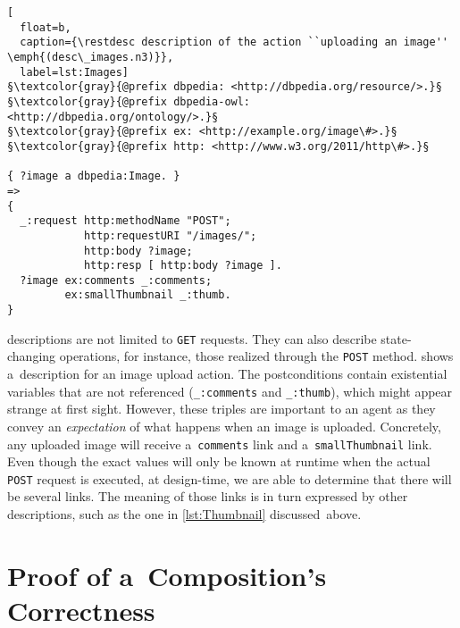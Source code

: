\begin{lstlisting}[
  float=b,
  caption={\restdesc description of the action ``uploading an image'' \emph{(desc\_images.n3)}},
  label=lst:Images]
§\textcolor{gray}{@prefix dbpedia: <http://dbpedia.org/resource/>.}§
§\textcolor{gray}{@prefix dbpedia-owl: <http://dbpedia.org/ontology/>.}§
§\textcolor{gray}{@prefix ex: <http://example.org/image\#>.}§
§\textcolor{gray}{@prefix http: <http://www.w3.org/2011/http\#>.}§

{ ?image a dbpedia:Image. }
=>
{
  _:request http:methodName "POST";
            http:requestURI "/images/";
            http:body ?image;
            http:resp [ http:body ?image ].
  ?image ex:comments _:comments;
         ex:smallThumbnail _:thumb.
}
\end{lstlisting}

\restdesc descriptions are not limited to \verb!GET! requests.
They can also describe state-changing operations,
for instance, those realized through the \verb!POST! method.
 shows a~description for an image upload action.
The postconditions contain existential variables that are not referenced
(\verb!_:comments! and \verb!_:thumb!),
which might appear strange at first sight.
However, these triples are important to an agent
as they convey an \emph{expectation} of what happens when an image is uploaded.
Concretely, any uploaded image will receive a~\verb!comments! link
and a~\verb!smallThumbnail! link.
Even though the exact values will only be known at runtime
when the actual \verb!POST! request is executed,
at design-time, we are able to determine that there will be several links.
The meaning of those links is in turn expressed by other descriptions,
such as the one in \cref{lst:Thumbnail} discussed~above.

\section{Proof of a~Composition's Correctness}
\label{sec:Proof}

% 
% 

